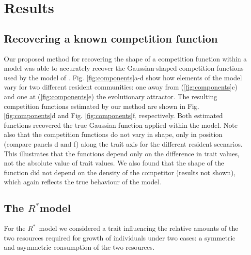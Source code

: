 \documentclass[a4paper,11pt]{article}
\newcommand{\Rstar}{\ensuremath{R^*}}
\begin{document}
\section{Results}

\subsection{Recovering a known competition function}

Our proposed method for recovering the shape of a competition function within a model was able to accurately recover the Gaussian-shaped competition functions used by the model of \citet{Dieckmann-1999}. Fig. \ref{fig:components}a-d show how elements of the model vary for two different resident communities: one away from (\ref{fig:components}c) and one at (\ref{fig:components}e) the evolutionary attractor. The resulting competition functions estimated by our method are shown in Fig. \ref{fig:components}d and Fig. \ref{fig:components}f, respectively. Both estimated functions recovered the true Gaussian function applied within the model. Note also that the competition functions do not vary in shape, only in position (compare panels d and f) along the trait axis for the different resident scenarios. This illustrates that the functions depend only on the difference in trait values, not the absolute value of trait values. We also found that the shape of the function did not depend on the density of the competitor (results not shown), which again reflects the true behaviour of the model.

\subsection{The \Rstar model}

For the \Rstar\ model we considered a trait influencing the relative amounts of the two resources required for growth of individuals under two cases: a symmetric and asymmetric consumption of the two resources.
\end{document}
